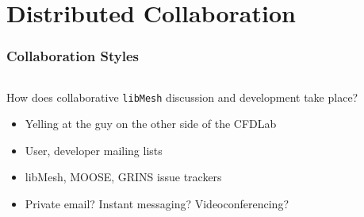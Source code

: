 \documentclass[mathserif]{beamer}
\newcommand{\software}[1]{{\texttt{#1}}}
\newcommand{\libMesh}{\software{libMesh}}
\begin{document}
\section{Distributed Collaboration}

\begin{frame}
\frametitle{Collaboration Styles}

\begin{columns}
\begin{column}{.6\textwidth}

How does collaborative \libMesh{} discussion and development take place?

\pause

\begin{itemize}[<+->]
    \item Yelling at the guy on the other side of the CFDLab
    \item User, developer mailing lists
    \item libMesh, MOOSE, GRINS issue trackers
    \item Private email?  Instant messaging?  Videoconferencing?
\end{itemize}

\end{column}
\begin{column}{.4\textwidth}



\end{column}
\end{columns}
\end{frame}
\end{document}
